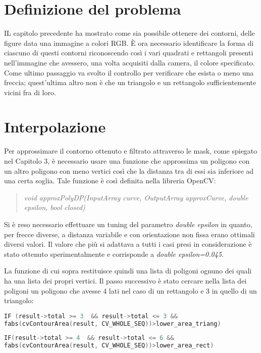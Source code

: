 \section{Definizione del problema}
IL capitolo precedente ha mostrato come sia possibile ottenere dei contorni, delle figure data una immagine a colori RGB.
È ora necessario identificare la forma di ciascuno di questi contorni riconoscendo così i vari quadrati e rettangoli presenti nell'immagine che avessero, una volta acquisiti dalla camera, il colore specificato. Come ultimo passaggio va svolto il controllo per verificare che esista o meno una freccia; quest'ultima altro non è che un triangolo e un rettangolo sufficientemente vicini fra di loro.

\section{Interpolazione}
Per approssimare il contorno ottenuto e filtrato attraverso le mask, come spiegato nel Capitolo 3, è necessario usare una funzione che approssima un poligono con un altro poligono con meno vertici così che la distanza tra di essi sia inferiore ad una certa soglia. Tale funzione è così definita nella libreria OpenCV:

\begin{quotation}
	\textsl{void approxPolyDP(InputArray curve, OutputArray approxCurve, double epsilon, bool closed)}
\end{quotation}

Si è reso necessario effettuare un tuning del parametro \textsl{double epsilon} in quanto, per frecce diverse, a distanza variabile e con orientazione non fissa erano ottimali diversi valori. Il valore che più si adattava a tutti i casi presi in considerazione è stato ottenuto sperimentalmente e corrisponde a \textsl{double epsilon=0.045}.

La funzione di cui sopra restituisce quindi una lista di poligoni ognuno dei quali ha una lista dei propri vertici.
Il passo successivo è stato cercare nella lista dei poligoni un poligono che avesse 4 lati nel caso di un rettangolo e 3 in quello di un triangolo:

\begin{lstlisting}[language=c]
IF (result->total >= 3  && result->total <= 3 && 
fabs(cvContourArea(result, CV_WHOLE_SEQ))>lower_area_triang)
\end{lstlisting}
\begin{lstlisting}[language=c]
IF(result->total >= 4  && result->total <= 6 && 
fabs(cvContourArea(result, CV_WHOLE_SEQ))>lower_area_rect)
\end{lstlisting}

